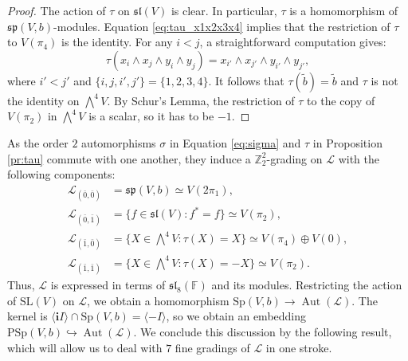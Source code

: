\documentclass[a4paper,reqno]{amsart}
\theoremstyle{definition}
\numberwithin{theorem}{section}
\numberwithin{equation}{section}
\begin{document}
\begin{proof}
The action of $\tau$ on ${{\mathfrak{sl}}}(V)$ is clear. In particular, $\tau$ is a homomorphism of ${{\mathfrak{sp}}}(V,b)$-modules. Equation \eqref{eq:tau_x1x2x3x4} implies that the restriction of $\tau$ to $V({\pi}_4)$ is the identity. For any  $i<j$, a straightforward computation gives:
\[
\tau(x_i\wedge x_j\wedge y_i\wedge y_j)=x_{i'}\wedge x_{j'}\wedge y_{i'}\wedge y_{j'},
\]
where $i'<j'$ and $\{i,j,i',j'\}=\{1,2,3,4\}$. It follows that $\tau(\tilde b)=\tilde b$ and $\tau$ is not the identity on $\bigwedge^4V$. 
By Schur's Lemma, the restriction of $\tau$ to the copy of $V({\pi}_2)$ in $\bigwedge^4V$ is a scalar, so it has to be $-1$.
\end{proof}

As the order $2$ automorphisms $\sigma$ in Equation \eqref{eq:sigma} and $\tau$ in Proposition \ref{pr:tau} commute with one another, they induce a ${\mathbb{Z}}_2^2$-grading on ${\mathcal{L}}$ with the following components:
\begin{equation}\label{eq:Z22onE7}
\begin{split}
{\mathcal{L}}_{(\bar 0,\bar 0)}&={{\mathfrak{sp}}}(V,b)\simeq V(2{\pi}_1),\\
{\mathcal{L}}_{(\bar 0,\bar 1)}&=\{ f\in{{\mathfrak{sl}}}(V): f^*=f\}\simeq V({\pi}_2),\\
{\mathcal{L}}_{(\bar 1,\bar 0)}&=\{X\in {\textstyle \bigwedge^4V}: \tau(X)=X\}\simeq V({\pi}_4)\oplus V(0),\\
{\mathcal{L}}_{(\bar 1,\bar 1)}&=\{X\in {\textstyle \bigwedge^4V}: \tau(X)=-X\}\simeq V({\pi}_2).
\end{split}
\end{equation}
Thus, ${\mathcal{L}}$ is expressed in terms of ${{\mathfrak{sl}}}_8({\mathbb{F}})$ and its modules. Restricting the action of ${\mathrm{SL}}(V)$ on ${\mathcal{L}}$, we obtain a homomorphism ${\mathrm{Sp}}(V,b)\to\operatorname{\mathrm{Aut}}({\mathcal{L}})$. The kernel is $\langle {\mathbf{i}} I\rangle\cap{\mathrm{Sp}}(V,b)=\langle-I\rangle$, so we obtain an embedding ${\mathrm{PSp}}(V,b)\hookrightarrow\operatorname{\mathrm{Aut}}({\mathcal{L}})$. We conclude this discussion by the following result, which will allow us to deal with $7$ fine gradings of ${\mathcal{L}}$ in one stroke.
\end{document}
